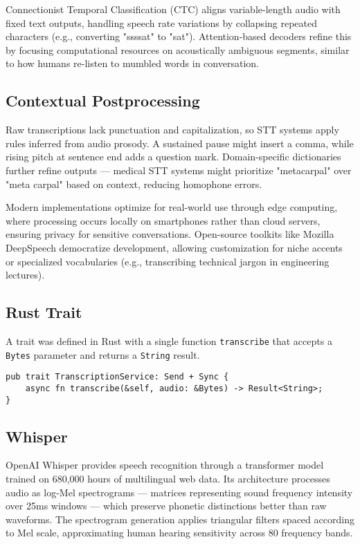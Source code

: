 Connectionist Temporal Classification (CTC) aligns variable-length audio with fixed text outputs,
handling speech rate variations by collapsing repeated characters (e.g., converting "ssssat" to "sat").
Attention-based decoders refine this by focusing computational resources on acoustically ambiguous segments,
similar to how humans re-listen to mumbled words in conversation.

\subsection{Contextual Postprocessing}
Raw transcriptions lack punctuation and capitalization, so STT systems apply rules inferred from audio prosody.
A sustained pause might insert a comma, while rising pitch at sentence end adds a question mark.
Domain-specific dictionaries further refine outputs --- medical STT systems might prioritize "metacarpal" over
"meta carpal" based on context, reducing homophone errors.

Modern implementations optimize for real-world use through edge computing, where processing occurs locally
on smartphones rather than cloud servers, ensuring privacy for sensitive conversations.
Open-source toolkits like Mozilla DeepSpeech democratize development, allowing customization for niche accents
or specialized vocabularies (e.g., transcribing technical jargon in engineering lectures).

\subsection{Rust Trait}
A trait was defined in Rust with a single function \texttt{transcribe} that accepts a \texttt{Bytes} parameter and returns a \texttt{String} result.
\begin{verbatim}
pub trait TranscriptionService: Send + Sync {
    async fn transcribe(&self, audio: &Bytes) -> Result<String>;
}
\end{verbatim}

\subsection{Whisper}
OpenAI Whisper provides speech recognition through a transformer model trained on
680,000 hours of multilingual web data. Its architecture processes audio as
log-Mel spectrograms --- matrices representing sound frequency intensity over 25ms windows ---
which preserve phonetic distinctions better than raw waveforms. The spectrogram
generation applies triangular filters spaced according to Mel scale, approximating
human hearing sensitivity across 80 frequency bands.

